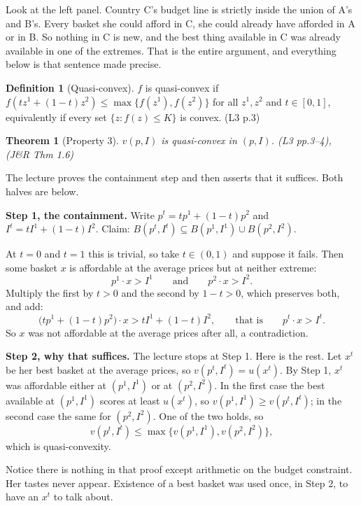 \documentclass[11pt,letterpaper]{article}
\theoremstyle{definition}
\newtheorem{defn}{Definition}
\theoremstyle{plain}
\newtheorem{thm}{Theorem}
\newcommand{\src}[1]{{\small\textsf{(#1)}}}
\newcommand{\skipnote}{\noindent{\small\textsf{Proof. Skippable on a first read.}}\par\smallskip}
\begin{document}
Look at the left panel. Country C's budget line is strictly inside the union of A's and B's. Every
basket she could afford in C, she could already have afforded in A or in B. So nothing in C is new,
and the best thing available in C was already available in one of the extremes. That is the entire
argument, and everything below is that sentence made precise.

\begin{defn}[Quasi-convex] $f$ is quasi-convex if
$f(t z^1 + (1-t) z^2) \le \max\{ f(z^1), f(z^2) \}$ for all $z^1, z^2$ and $t \in [0,1]$,
equivalently if every set $\{ z : f(z) \le K \}$ is convex. \src{L3 p.3}
\end{defn}

\begin{thm}[Property 3] \label{thm:qcx}
$v(p,I)$ is quasi-convex in $(p,I)$. \src{L3 pp.3--4}, \src{J\&R Thm 1.6}
\end{thm}

The lecture proves the containment step and then asserts that it suffices. Both halves are below.

\skipnote
\begin{leftbar}
\small
\textbf{Step 1, the containment.} Write $p^t = t p^1 + (1-t)p^2$ and $I^t = t I^1 + (1-t) I^2$. Claim:
$B(p^t, I^t) \subseteq B(p^1,I^1) \cup B(p^2,I^2)$.

At $t = 0$ and $t=1$ this is trivial, so take $t \in (0,1)$ and suppose it fails. Then some basket
$x$ is affordable at the average prices but at neither extreme:
\[
p^1 \cdot x > I^1 \qquad \text{and} \qquad p^2 \cdot x > I^2 .
\]
Multiply the first by $t > 0$ and the second by $1-t > 0$, which preserves both, and add:
\[
\big( t p^1 + (1-t) p^2 \big) \cdot x > t I^1 + (1-t) I^2, \qquad \text{that is} \qquad
p^t \cdot x > I^t .
\]
So $x$ was not affordable at the average prices after all, a contradiction.

\textbf{Step 2, why that suffices.} The lecture stops at Step 1. Here is the rest. Let $x^t$ be her
best basket at the average prices, so $v(p^t,I^t) = u(x^t)$. By Step 1, $x^t$ was affordable either
at $(p^1,I^1)$ or at $(p^2,I^2)$. In the first case the best available at $(p^1,I^1)$ scores at least
$u(x^t)$, so $v(p^1,I^1) \ge v(p^t,I^t)$; in the second case the same for $(p^2,I^2)$. One of the two
holds, so
\[
v(p^t, I^t) \le \max\{ v(p^1,I^1), v(p^2,I^2) \},
\]
which is quasi-convexity.
\end{leftbar}

Notice there is nothing in that proof except arithmetic on the budget constraint. Her tastes never
appear. Existence of a best basket was used once, in Step 2, to have an $x^t$ to talk about.
\end{document}
